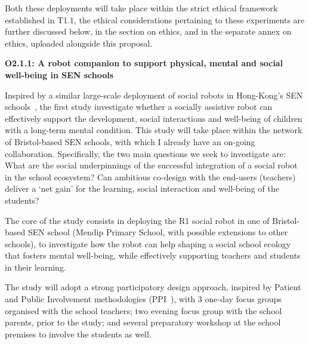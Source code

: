 \begin{rewrite}
Both these deployments will take place within the strict ethical framework
established in T1.1, the ethical considerations pertaining to these experiments
are further discussed below, in the section on ethics, and in the separate annex
on ethics, uploaded alongside this proposal.



\textbf{O2.1.1: A robot companion to support physical, mental and social
well-being in SEN schools}

Inspired by a similar large-scale deployment of social robots in Hong-Kong's SEN
schools~\cite{robot4sen}, the first study investigate whether a socially
assistive robot can effectively support the development, social
interactions and well-being of children with a long-term mental condition. This
study will take place within the network of Bristol-based SEN schools, with
which I already have an on-going collaboration.  Specifically, the two main
questions we seek to investigate are: What are the social underpinnings of the
successful integration of a social robot in the school ecosystem? Can ambitious
co-design with the end-users (teachers) deliver a `net gain' for the learning,
social interaction and well-being of the students? 

The core of the study consists in deploying the R1 social robot in one of
Bristol-based SEN school (Mendip Primary School, with possible extensions to
other schools), to investigate how the robot can help shaping a social school
ecology that fosters mental well-being, while effectively supporting teachers
and students in their learning. 

The study will adopt a strong participatory design approach, inspired by
Patient and Public Involvement methodologies (PPI~\cite{boivin2010patient}),
with 3 one-day focus groups organised with the school teachers; two evening focus group with the
school parents, prior to the study; and several preparatory workshop at the
school premises to involve the students as well.



\end{rewrite}
